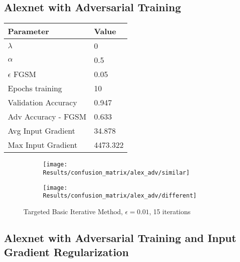 \documentclass[draft,final]{vutinfth} %
\begin{document}
\subsection{Alexnet with Adversarial Training}
\begin{table}[h]
  \centering
  \begin{tabular}{ll}
    \toprule
			Parameter			& Value   \\
    \midrule
			$\lambda$								& 0				\\
			$\alpha$								& 0.5			\\
			$\epsilon$ FGSM					& 0.05		\\
			Epochs training					& 10			\\
			
			Validation Accuracy			& 0.947		\\
			Adv Accuracy - FGSM			& 0.633 	\\
			
			Avg Input Gradient			& 34.878	\\
			Max Input Gradient 			& 4473.322\\
    \bottomrule
  \end{tabular}
\end{table}


\begin{figure}[h]
  \begin{subfigure}[b]{0.5\columnwidth}
		\centering
    \texttt{[image: Results/confusion\_matrix/alex\_adv/similar]}
    \label{fig:exp:cm:alex_adv:similar}
  \end{subfigure}
  \begin{subfigure}[b]{0.5\columnwidth}
		\centering
    \texttt{[image: Results/confusion\_matrix/alex\_adv/different]}
    \label{fig:exp:cm:alex_adv:different}
  \end{subfigure}
  \caption{Targeted Basic Iterative Method, $\epsilon = 0.01$, 15 iterations}
\end{figure}
\clearpage

\subsection{Alexnet with Adversarial Training and Input Gradient Regularization}
\end{document}
